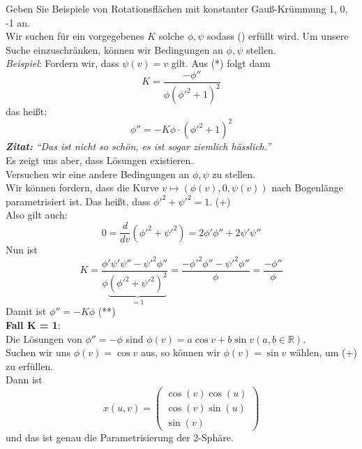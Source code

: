 \begin{problem*}[2b]
  Geben Sie Beispiele von Rotationsflächen mit konstanter Gauß-Krümmung 1, 0, -1 an. \\
  Wir suchen für ein vorgegebenes \( K \) solche \( \phi, \psi \) sodass (\*) erfüllt wird. Um unsere Suche einzuschränken, können wir Bedingungen an \( \phi, \psi \) stellen. \\
  \emph{Beispiel}: Fordern wir, dass \( \psi(v) = v \) gilt. Aus (*) folgt dann 
  \begin{equation*}
    K = \frac{-\phi''}{\phi{(\phi'^2 + 1)}^2}
  \end{equation*}	
  das heißt:
  \begin{equation*}
    \phi'' = -K \phi \cdot {(\phi'^2 + 1)}^2
  \end{equation*}	
  \emph{\textbf{Zitat:}} \emph{``Das ist nicht so schön, es ist sogar ziemlich hässlich.''} \\
  Es zeigt uns aber, dass Lösungen existieren. \\
  Versuchen wir eine andere Bedingungen an \( \phi, \psi \) zu stellen. \\
  Wir können fordern, dass die Kurve \( v \mapsto (\phi(v), 0, \psi(v)) \) nach Bogenlänge parametrisiert ist. Das heißt, dass \( \phi'^2 + \psi'^2 = 1 \). (+)\\
  Also gilt auch:
  \begin{equation*}
    0 = \frac{d}{dv}(\phi'^2 + \psi'^2) = 2 \phi'\phi'' + 2 \psi' \psi''
  \end{equation*}
  Nun ist 
  \begin{equation*}
    K = \frac{\phi' \psi' \psi'' - \psi'^2 \phi''}{\phi\underbrace{{(\phi'^2 + \psi'^2)}^2}_{= 1}} = \frac{-\phi'^2 \phi'' - \psi'^2 \phi''}{\phi} = \frac{-\phi''}{\phi}
  \end{equation*}
  Damit ist \( \phi'' = -K \phi \) (**) \\
  \textbf{Fall K = 1}: \\
  Die Lösungen von \( \phi'' = - \phi \) sind \( \phi(v) = a \cos v + b \sin v (a,b \in \mathbb{R}) \). \\
  Suchen wir uns \( \phi(v) = \cos v \) aus, so können wir \( \phi(v) = \sin v \) wählen, um (+) zu erfüllen. \\
  Dann ist
  \begin{equation*}
    x(u,v) = \begin{pmatrix}
      \cos(v) \cos(u) \\
      \cos(v) \sin(u) \\
      \sin(v)	
    \end{pmatrix}
  \end{equation*}
  und das ist genau die Parametrisierung der 2-Sphäre.


\end{problem*}
